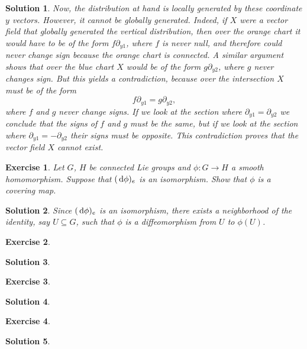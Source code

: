 \documentclass{article}
\newtheorem{ex}{Exercise}
\theoremstyle{nonumberplain}
\newtheorem{sol}{Solution}
\begin{document}
\begin{sol}
Now, the distribution at hand is locally generated by these coordinate $y$ vectors. However, it cannot be globally generated. Indeed, if $X$ were a vector field that globally generated the vertical distribution, then over the orange chart it would have to be of the form $f \partial_{y1}$, where $f$ is never null, and therefore could never change sign because the orange chart is connected. A similar argument shows that over the blue chart $X$ would be of the form $g \partial_{y2}$, where $g$ never changes sign. But this yields a contradiction, because over the intersection $X$ must be of the form
\[f \partial_{y1} = g \partial_{y2},\]
where $f$ and $g$ never change signs. If we look at the section where $\partial_{y1} = \partial_{y2}$ we conclude that the signs of $f$ and $g$ must be the same, but if we look at the section where $\partial_{y1} = - \partial_{y2}$ their signs must be opposite. This contradiction proves that the vector field $X$ cannot exist.
\end{sol}

\begin{ex}
Let $G$, $H$ be connected Lie groups and $\phi \colon G \to H$ a smooth homomorphism. Suppose that $(\dl \phi)_e$ is an isomorphism. Show that $\phi$ is a covering map.
\end{ex}

\begin{sol}
Since $(\dl \phi)_e$ is an isomorphism, there exists a neighborhood of the identity, say $U \subseteq G$, such that $\phi$ is a diffeomorphism from $U$ to $\phi(U)$.
\end{sol}

\begin{ex}
\end{ex}

\begin{sol}
\end{sol}

\begin{ex}
\end{ex}

\begin{sol}
\end{sol}

\begin{ex}
\end{ex}

\begin{sol}
\end{sol}
\end{document}
